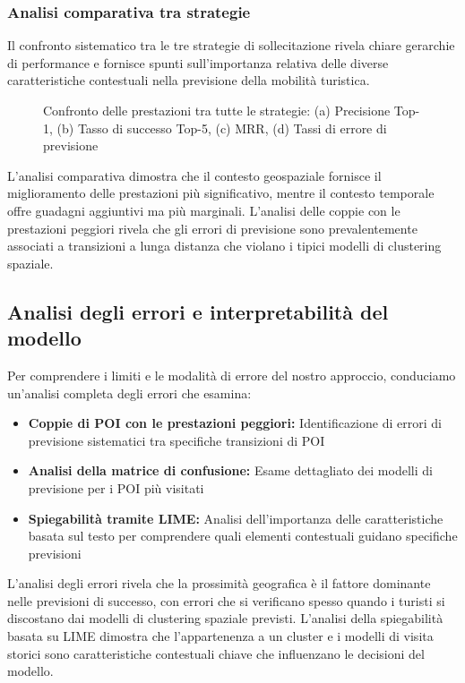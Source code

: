 \subsubsection{Analisi comparativa tra strategie}

Il confronto sistematico tra le tre strategie di sollecitazione rivela chiare gerarchie di performance e fornisce spunti sull'importanza relativa delle diverse caratteristiche contestuali nella previsione della mobilità turistica.

\begin{figure}[h]
\centering
\caption{Confronto delle prestazioni tra tutte le strategie: (a) Precisione Top-1, (b) Tasso di successo Top-5, (c) MRR, (d) Tassi di errore di previsione}
\label{fig:strategy_comparison_detailed}
\end{figure}

L'analisi comparativa dimostra che il contesto geospaziale fornisce il miglioramento delle prestazioni più significativo, mentre il contesto temporale offre guadagni aggiuntivi ma più marginali. L'analisi delle coppie con le prestazioni peggiori rivela che gli errori di previsione sono prevalentemente associati a transizioni a lunga distanza che violano i tipici modelli di clustering spaziale.

\subsection{Analisi degli errori e interpretabilità del modello}

Per comprendere i limiti e le modalità di errore del nostro approccio, conduciamo un'analisi completa degli errori che esamina:

\begin{itemize}
\item \textbf{Coppie di POI con le prestazioni peggiori:} Identificazione di errori di previsione sistematici tra specifiche transizioni di POI
\item \textbf{Analisi della matrice di confusione:} Esame dettagliato dei modelli di previsione per i POI più visitati
\item \textbf{Spiegabilità tramite LIME:} Analisi dell'importanza delle caratteristiche basata sul testo per comprendere quali elementi contestuali guidano specifiche previsioni
\end{itemize}

L'analisi degli errori rivela che la prossimità geografica è il fattore dominante nelle previsioni di successo, con errori che si verificano spesso quando i turisti si discostano dai modelli di clustering spaziale previsti. L'analisi della spiegabilità basata su LIME dimostra che l'appartenenza a un cluster e i modelli di visita storici sono caratteristiche contestuali chiave che influenzano le decisioni del modello.

